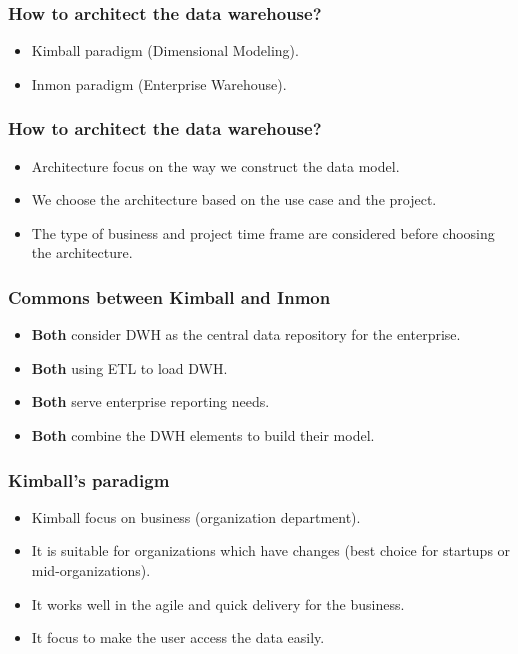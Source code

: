 \begin{frame}
	\frametitle{How to architect the data warehouse?}
	\begin{itemize}[<+->]
		\item Kimball paradigm (Dimensional Modeling).
		\item Inmon paradigm (Enterprise Warehouse).
	\end{itemize}
\end{frame}
\begin{frame}
	\frametitle{How to architect the data warehouse? }
	\begin{itemize}[<+->]
	\item Architecture focus on the way we construct the data model.
	\item We choose the architecture based on the use case and the project.
	\item The type of business and project time frame are considered before choosing the architecture. 
\end{itemize}
	
\end{frame}
\begin{frame}
	\frametitle{Commons between Kimball and Inmon}
		\begin{itemize}[<+->]
		\item \textbf{Both} consider DWH as the central data repository for the enterprise.
		\item \textbf{Both} using ETL to load DWH.
		\item \textbf{Both} serve enterprise reporting needs.
		\item \textbf{Both} combine the DWH elements to build their model.
	\end{itemize}

\end{frame}
\begin{frame}
	\frametitle{Kimball's paradigm}
	\begin{itemize}[<+->]
		\item Kimball focus on business (organization department).
		\item It is suitable for organizations which have changes (best choice for startups or mid-organizations).
		\item It works well in the agile and quick delivery for the business.
		\item It focus to make the user  access the data easily.
	\end{itemize}
	
\end{frame}
